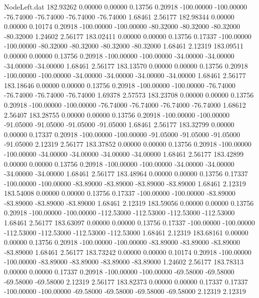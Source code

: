 \begin{filecontents}{NodeLeft.dat}
 182.93262    0.00000    0.00000     0.13756    0.20918 -100.00000 -100.00000  -76.74000  -76.74000  -76.74000  -76.74000    1.68461    2.56177
 182.98344    0.00000    0.00000     0.10174    0.20918 -100.00000 -100.00000  -80.32000  -80.32000  -80.32000  -80.32000    1.24602    2.56177
 183.02411    0.00000    0.00000     0.13756    0.17337 -100.00000 -100.00000  -80.32000  -80.32000  -80.32000  -80.32000    1.68461    2.12319
 183.09511    0.00000    0.00000     0.13756    0.20918 -100.00000 -100.00000  -34.00000  -34.00000  -34.00000  -34.00000    1.68461    2.56177
 183.13570    0.00000    0.00000     0.13756    0.20918 -100.00000 -100.00000  -34.00000  -34.00000  -34.00000  -34.00000    1.68461    2.56177
 183.18646    0.00000    0.00000     0.13756    0.20918 -100.00000 -100.00000  -76.74000  -76.74000  -76.74000  -76.74000    1.69378    2.57573
 183.23708    0.00000    0.00000     0.13756    0.20918 -100.00000 -100.00000  -76.74000  -76.74000  -76.74000  -76.74000    1.68612    2.56407
 183.28755    0.00000    0.00000     0.13756    0.20918 -100.00000 -100.00000  -91.05000  -91.05000  -91.05000  -91.05000    1.68461    2.56177
 183.32799    0.00000    0.00000     0.17337    0.20918 -100.00000 -100.00000  -91.05000  -91.05000  -91.05000  -91.05000    2.12319    2.56177
 183.37852    0.00000    0.00000     0.13756    0.20918 -100.00000 -100.00000  -34.00000  -34.00000  -34.00000  -34.00000    1.68461    2.56177
 183.42899    0.00000    0.00000     0.13756    0.20918 -100.00000 -100.00000  -34.00000  -34.00000  -34.00000  -34.00000    1.68461    2.56177
 183.48964    0.00000    0.00000     0.13756    0.17337 -100.00000 -100.00000  -83.89000  -83.89000  -83.89000  -83.89000    1.68461    2.12319
 183.54008    0.00000    0.00000     0.13756    0.17337 -100.00000 -100.00000  -83.89000  -83.89000  -83.89000  -83.89000    1.68461    2.12319
 183.59056    0.00000    0.00000     0.13756    0.20918 -100.00000 -100.00000 -112.53000 -112.53000 -112.53000 -112.53000    1.68461    2.56177
 183.63097    0.00000    0.00000     0.13756    0.17337 -100.00000 -100.00000 -112.53000 -112.53000 -112.53000 -112.53000    1.68461    2.12319
 183.68161    0.00000    0.00000     0.13756    0.20918 -100.00000 -100.00000  -83.89000  -83.89000  -83.89000  -83.89000    1.68461    2.56177
 183.73242    0.00000    0.00000     0.10174    0.20918 -100.00000 -100.00000  -83.89000  -83.89000  -83.89000  -83.89000    1.24602    2.56177
 183.78313    0.00000    0.00000     0.17337    0.20918 -100.00000 -100.00000  -69.58000  -69.58000  -69.58000  -69.58000    2.12319    2.56177
 183.82373    0.00000    0.00000     0.17337    0.17337 -100.00000 -100.00000  -69.58000  -69.58000  -69.58000  -69.58000    2.12319    2.12319

\end{filecontents}
